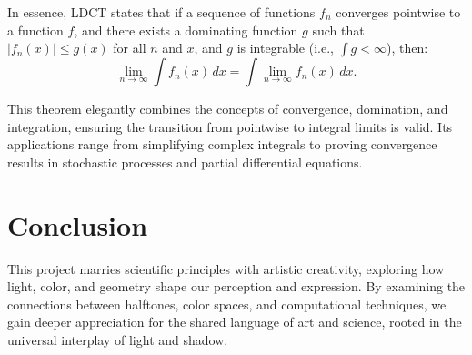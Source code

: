 In essence, LDCT states that if a sequence of functions \(f_n\) converges pointwise to a function \(f\), and there exists a dominating function \(g\) such that \(|f_n(x)| \leq g(x)\) for all \(n\) and \(x\), and \(g\) is integrable (i.e., \(\int g < \infty\)), then:
\[
\lim_{n \to \infty} \int f_n(x) \, dx = \int \lim_{n \to \infty} f_n(x) \, dx.
\]

This theorem elegantly combines the concepts of convergence, domination, and integration, ensuring the transition from pointwise to integral limits is valid. Its applications range from simplifying complex integrals to proving convergence results in stochastic processes and partial differential equations.



\section*{Conclusion}
This project marries scientific principles with artistic creativity, exploring how light, color, and geometry shape our perception and expression. By examining the connections between halftones, color spaces, and computational techniques, we gain deeper appreciation for the shared language of art and science, rooted in the universal interplay of light and shadow.


